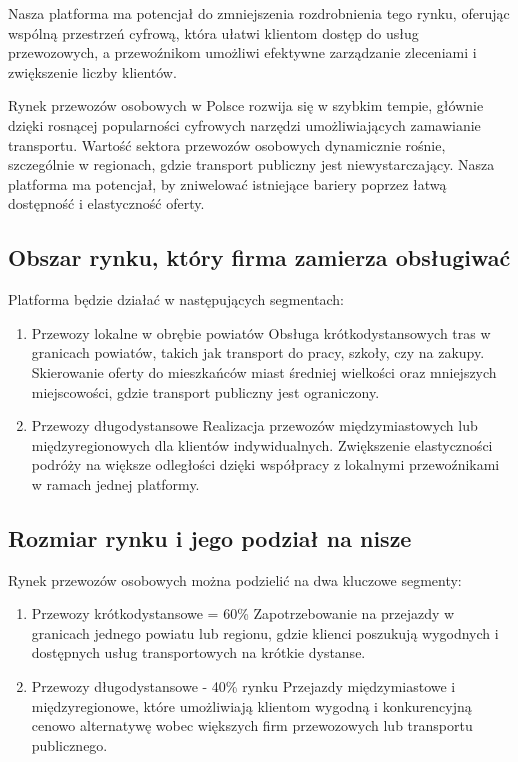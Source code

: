 Nasza platforma ma potencjał do zmniejszenia rozdrobnienia tego rynku, oferując wspólną przestrzeń cyfrową, która ułatwi klientom dostęp do usług przewozowych, a przewoźnikom umożliwi efektywne zarządzanie zleceniami i zwiększenie liczby klientów.

Rynek przewozów osobowych w Polsce rozwija się w szybkim tempie, głównie dzięki rosnącej popularności cyfrowych narzędzi umożliwiających zamawianie transportu. Wartość sektora przewozów osobowych dynamicznie rośnie, szczególnie w regionach, gdzie transport publiczny jest niewystarczający. Nasza platforma ma potencjał, by zniwelować istniejące bariery poprzez łatwą dostępność i elastyczność oferty.

\subsection{Obszar rynku, który firma zamierza obsługiwać}
Platforma będzie działać w następujących segmentach:
\begin{enumerate}
     
    \item Przewozy lokalne w obrębie powiatów
        Obsługa krótkodystansowych tras w granicach powiatów, takich jak transport do pracy, szkoły, czy na zakupy.
        Skierowanie oferty do mieszkańców miast średniej wielkości oraz mniejszych miejscowości, gdzie transport publiczny jest ograniczony.

    \item Przewozy długodystansowe
        Realizacja przewozów międzymiastowych lub międzyregionowych dla klientów indywidualnych.
        Zwiększenie elastyczności podróży na większe odległości dzięki współpracy z lokalnymi przewoźnikami w ramach jednej platformy.
 
\end{enumerate}      

\subsection{Rozmiar rynku i jego podział na nisze}
    Rynek przewozów osobowych można podzielić na dwa kluczowe segmenty:
    \begin{enumerate}
        \item Przewozy krótkodystansowe = 60\%
            Zapotrzebowanie na przejazdy w granicach jednego powiatu lub regionu, gdzie klienci poszukują wygodnych i dostępnych usług transportowych na krótkie dystanse.
        \item Przewozy długodystansowe - 40\% rynku
            Przejazdy międzymiastowe i międzyregionowe, które umożliwiają klientom wygodną i konkurencyjną cenowo alternatywę wobec większych firm przewozowych lub transportu publicznego.
    \end{enumerate}

